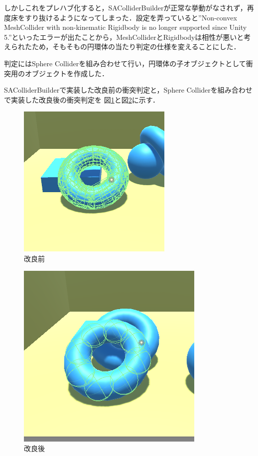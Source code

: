 \documentclass[12pt]{jarticle}
\begin{document}
しかしこれをプレハブ化すると，SAColliderBuilderが正常な挙動がなされず，再度床をすり抜けるようになってしまった．設定を弄っていると''Non-convex MeshCollider with non-kinematic Rigidbody is no longer supported since Unity 5.''といったエラーが出たことから，MeshColliderとRigidbodyは相性が悪いと考えられたため，そもそもの円環体の当たり判定の仕様を変えることにした．

判定にはSphere Colliderを組み合わせて行い，円環体の子オブジェクトとして衝突用のオブジェクトを作成した．

SAColliderBuilderで実装した改良前の衝突判定と，Sphere Colliderを組み合わせで実装した改良後の衝突判定を
図\ref{fig:bwp1}と図\ref{fig:bwp2}に示す．

\begin{figure}[!hbt]
  	\begin{center}
  		\includegraphics[scale=0.55]{images/bwp1.png}
	\end{center}
  	\caption{改良前}
  	\label{fig:bwp1}
\end{figure}

\begin{figure}[!hbt]
  	\begin{center}
  		\includegraphics[scale=0.5]{images/bwp2.png}
	\end{center}
  	\caption{改良後}
  	\label{fig:bwp2}
\end{figure}
\end{document}
